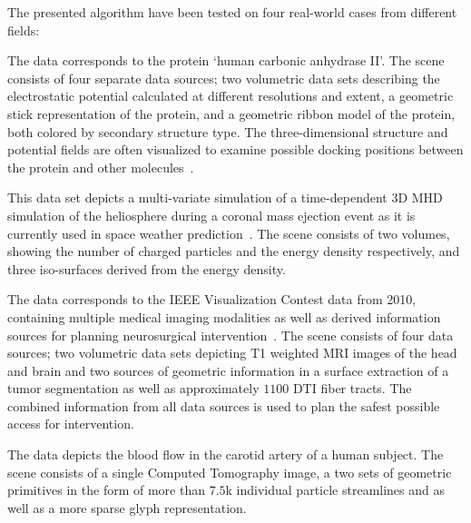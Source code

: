 \documentclass{egpubl}
\begin{document}
The presented algorithm have been tested on four real-world cases from different fields:
\begin{description}[font=\normalfont\itshape]
\item[Figure~\ref{fig:protein}, Protein:]%
The data corresponds to the protein `human carbonic anhydrase II'. The scene consists of four separate data sources; two volumetric data sets describing the electrostatic potential calculated at different resolutions and extent, a geometric stick representation of the protein, and a geometric ribbon model of the protein, both colored by secondary structure type. The three-dimensional structure and potential fields are often visualized to examine possible docking positions between the protein and other molecules~\cite{Seeliger2010}.
\item[Figure~\ref{fig:space}, Space:]%
This data set depicts a multi-variate simulation of a time-dependent 3D MHD simulation of the heliosphere during a coronal mass ejection event as it is currently used in space weather prediction~\cite{Xie2004}. The scene consists of two volumes, showing the number of charged particles and the energy density respectively, and three iso-surfaces derived from the energy density. 
\item[Figure~\ref{fig:neuro-flow}(\subref{fig:sub:neuro}-\subref{fig:sub:neuro-dch}), Neuro:]%
The data corresponds to the IEEE Visualization Contest data from 2010, containing multiple medical imaging modalities as well as derived information sources for planning neurosurgical intervention~\cite{VisContest2010}. The scene consists of four data sources; two volumetric data sets depicting T1 weighted MRI images of the head and brain and two sources of geometric information in a surface extraction of a tumor segmentation as well as approximately $1100$ DTI fiber tracts. The combined information from all data sources is used to plan the safest possible  access for intervention.
\item[Figure~\ref{fig:neuro-flow}(\subref{fig:sub:flow}-\subref{fig:sub:flow-dch}), Flow:]%
The data depicts the blood flow in the carotid artery of a human subject. The scene consists of a single Computed Tomography image, a two sets of geometric primitives in the form of more than $7.5$k individual particle streamlines and as well as a more sparse glyph representation. 
\end{description}
\end{document}
